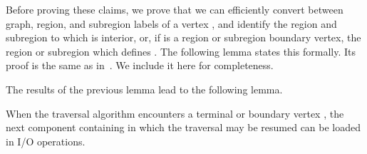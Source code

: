 Before proving these claims, we prove that we can efficiently convert between
graph, region, and subregion labels of a vertex , and identify the region and
subregion to which  is interior, or, if  is a region or subregion boundary vertex,
the region or subregion which defines .
The following lemma states this formally.
Its proof is the same as in~\cite{DBLP:journals/talg/BoseCHMM12}.
We include it here for completeness.

The results of the previous lemma lead to the following lemma.

\begin{lemma}
\label{lem:component_ios}
When the traversal algorithm encounters a terminal or boundary
vertex , the next component containing  in which the traversal
may be resumed can be loaded in  I/O operations.
\end{lemma}


